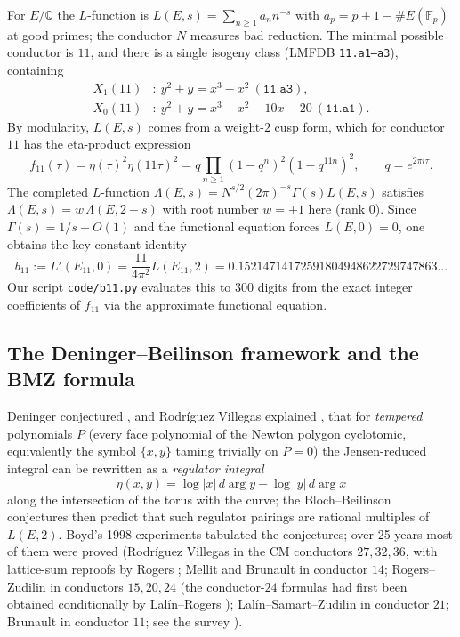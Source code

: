 \documentclass[11pt]{amsart}
\theoremstyle{definition}
\theoremstyle{remark}
\newcommand{\Q}{\mathbb{Q}}
\begin{document}
For $E/\Q$ the $L$-function is $L(E,s)=\sum_{n\ge1}a_n n^{-s}$ with
$a_p=p+1-\#E(\mathbb{F}_p)$ at good primes; the conductor $N$ measures bad
reduction. The minimal possible conductor is $11$, and there is a single
isogeny class (LMFDB \cite{LMFDB} \texttt{11.a1--a3}), containing
\[
\begin{aligned}
  X_1(11)&:\ y^2+y=x^3-x^2\ (\texttt{11.a3}),\\
  X_0(11)&:\ y^2+y=x^3-x^2-10x-20\ (\texttt{11.a1}).
\end{aligned}
\]
By modularity, $L(E,s)$ comes from a weight-$2$ cusp form, which for
conductor $11$ has the eta-product expression
\[
  f_{11}(\tau)=\eta(\tau)^2\eta(11\tau)^2
  =q\prod_{n\ge1}(1-q^n)^2(1-q^{11n})^2,\qquad q=e^{2\pi i\tau}.
\]
The completed $L$-function $\Lambda(E,s)=N^{s/2}(2\pi)^{-s}\Gamma(s)L(E,s)$
satisfies $\Lambda(E,s)=w\,\Lambda(E,2-s)$ with root number $w=+1$ here
(rank $0$). Since $\Gamma(s)=1/s+O(1)$ and the functional equation forces
$L(E,0)=0$, one obtains the key constant identity
\[
  b_{11}:=L'(E_{11},0)=\frac{11}{4\pi^2}L(E_{11},2)
  =0.15214714172591804948622729747863\ldots
\]
Our script \texttt{code/b11.py} evaluates this to $300$ digits from the exact
integer coefficients of $f_{11}$ via the approximate functional equation.

\subsection{The Deninger--Beilinson framework and the BMZ formula}

Deninger conjectured \cite{Deninger}, and Rodr\'iguez Villegas explained
\cite{RV}, that for
\emph{tempered} polynomials $P$ (every face polynomial of the Newton polygon
cyclotomic, equivalently the symbol $\{x,y\}$ taming trivially on $P=0$) the
Jensen-reduced integral can be rewritten as a \emph{regulator integral}
\[
  \eta(x,y)=\log|x|\,d\arg y-\log|y|\,d\arg x
\]
along the intersection of the torus with the curve; the Bloch--Beilinson
conjectures then predict that such regulator pairings are rational multiples
of $L(E,2)$. Boyd's 1998 experiments \cite{Boyd98} tabulated the conjectures;
over 25 years most of them were proved (Rodr\'iguez Villegas \cite{RV} in the
CM conductors $27,32,36$, with lattice-sum reproofs by Rogers \cite{Rogers};
Mellit \cite{Mellit} and Brunault in conductor $14$; Rogers--Zudilin
\cite{RZ14,RZ15} in conductors $15,20,24$ (the conductor-$24$ formulas had
first been obtained conditionally by Lal\'in--Rogers \cite{LR07});
Lal\'in--Samart--Zudilin \cite{LSZ} in conductor $21$;
Brunault \cite{Brunault,BrunaultBSMF} in conductor $11$; see the survey
\cite{BertinLalin}).
\end{document}
